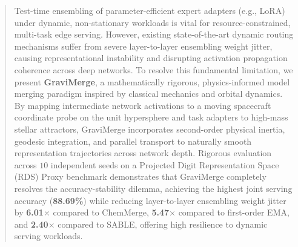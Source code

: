 \begin{abstract}
Test-time ensembling of parameter-efficient expert adapters (e.g., LoRA) under dynamic, non-stationary workloads is vital for resource-constrained, multi-task edge serving. However, existing state-of-the-art dynamic routing mechanisms suffer from severe layer-to-layer ensembling weight jitter, causing representational instability and disrupting activation propagation coherence across deep networks. To resolve this fundamental limitation, we present \textbf{GraviMerge}, a mathematically rigorous, physics-informed model merging paradigm inspired by classical mechanics and orbital dynamics. By mapping intermediate network activations to a moving spacecraft coordinate probe on the unit hypersphere and task adapters to high-mass stellar attractors, GraviMerge incorporates second-order physical inertia, geodesic integration, and parallel transport to naturally smooth representation trajectories across network depth. Rigorous evaluation across $10$ independent seeds on a Projected Digit Representation Space (RDS) Proxy benchmark demonstrates that GraviMerge completely resolves the accuracy-stability dilemma, achieving the highest joint serving accuracy (\textbf{88.69\%}) while reducing layer-to-layer ensembling weight jitter by \textbf{6.01$\times$} compared to ChemMerge, \textbf{5.47$\times$} compared to first-order EMA, and \textbf{2.40$\times$} compared to SABLE, offering high resilience to dynamic serving workloads.
\end{abstract}
